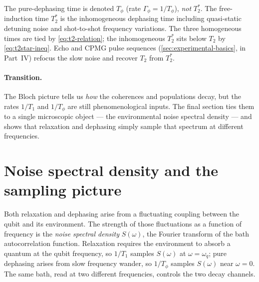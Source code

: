 \begin{remark}[Terminology]
\label{rem:t2-terminology}
The pure-dephasing time is denoted $T_\phi$ (rate
$\Gamma_\phi=1/T_\phi$), \emph{not} $T_2^*$. The free-induction time
$T_2^*$ is the inhomogeneous dephasing time including quasi-static
detuning noise and shot-to-shot frequency variations. The three
homogeneous times are tied by \cref{eq:t2-relation}; the
inhomogeneous $T_2^*$ sits below $T_2$ by \cref{eq:t2star-ineq}.
Echo and CPMG pulse sequences (\cref{sec:experimental-basics}, in
Part~IV) refocus the slow noise and recover $T_2$ from $T_2^*$.
\end{remark}

\paragraph{Transition.}
The Bloch picture tells us \emph{how} the coherences and
populations decay, but the rates $1/T_1$ and $1/T_\phi$ are still
phenomenological inputs. The final section ties them to a single
microscopic object --- the environmental noise spectral density ---
and shows that relaxation and dephasing simply sample that spectrum
at different frequencies.

\section{Noise spectral density and the sampling picture}
\label{sec:noise-psd}

\begin{phenomenon}
Both relaxation and dephasing arise from a fluctuating coupling
between the qubit and its environment. The strength of those
fluctuations as a function of frequency is the \emph{noise spectral
density} $S(\omega)$, the Fourier transform of the bath
autocorrelation function. Relaxation requires the environment to
absorb a quantum at the qubit frequency, so $1/T_1$ samples
$S(\omega)$ at $\omega=\omega_q$; pure dephasing arises from
slow frequency wander, so $1/T_\phi$ samples $S(\omega)$ near
$\omega=0$. The same bath, read at two different frequencies,
controls the two decay channels.
\end{phenomenon}

